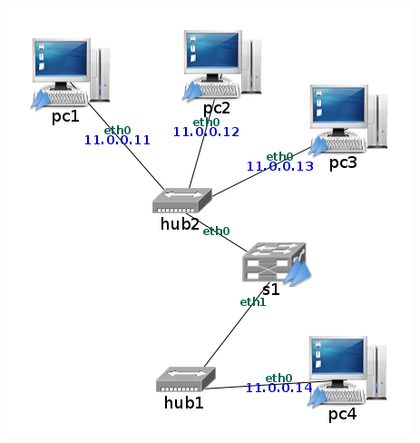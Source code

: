 \documentclass[12pt, a4paper]{report}
\begin{document}
\includegraphics*[scale=0.5,center]{enunciado5}
\end{document}
